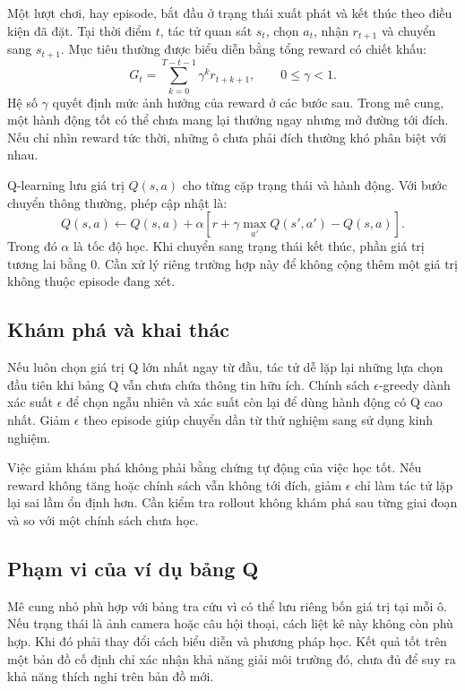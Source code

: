 Một lượt chơi, hay episode, bắt đầu ở trạng thái xuất phát và kết thúc theo điều kiện đã đặt. Tại thời điểm $t$, tác tử quan sát $s_t$, chọn $a_t$, nhận $r_{t+1}$ và chuyển sang $s_{t+1}$. Mục tiêu thường được biểu diễn bằng tổng reward có chiết khấu:
\begin{equation}
G_t=\sum_{k=0}^{T-t-1}\gamma^k r_{t+k+1},\qquad 0\leq\gamma<1.
\end{equation}
Hệ số $\gamma$ quyết định mức ảnh hưởng của reward ở các bước sau. Trong mê cung, một hành động tốt có thể chưa mang lại thưởng ngay nhưng mở đường tới đích. Nếu chỉ nhìn reward tức thời, những ô chưa phải đích thường khó phân biệt với nhau.

Q-learning lưu giá trị $Q(s,a)$ cho từng cặp trạng thái và hành động. Với bước chuyển thông thường, phép cập nhật là:
\begin{equation}
Q(s,a)\leftarrow Q(s,a)+\alpha\left[r+\gamma\max_{a'}Q(s',a')-Q(s,a)\right].
\end{equation}
Trong đó $\alpha$ là tốc độ học. Khi chuyển sang trạng thái kết thúc, phần giá trị tương lai bằng 0. Cần xử lý riêng trường hợp này để không cộng thêm một giá trị không thuộc episode đang xét.

\subsection{Khám phá và khai thác}
Nếu luôn chọn giá trị Q lớn nhất ngay từ đầu, tác tử dễ lặp lại những lựa chọn đầu tiên khi bảng Q vẫn chưa chứa thông tin hữu ích. Chính sách $\epsilon$-greedy dành xác suất $\epsilon$ để chọn ngẫu nhiên và xác suất còn lại để dùng hành động có Q cao nhất. Giảm $\epsilon$ theo episode giúp chuyển dần từ thử nghiệm sang sử dụng kinh nghiệm.

Việc giảm khám phá không phải bằng chứng tự động của việc học tốt. Nếu reward không tăng hoặc chính sách vẫn không tới đích, giảm $\epsilon$ chỉ làm tác tử lặp lại sai lầm ổn định hơn. Cần kiểm tra rollout không khám phá sau từng giai đoạn và so với một chính sách chưa học.

\subsection{Phạm vi của ví dụ bảng Q}
Mê cung nhỏ phù hợp với bảng tra cứu vì có thể lưu riêng bốn giá trị tại mỗi ô. Nếu trạng thái là ảnh camera hoặc câu hội thoại, cách liệt kê này không còn phù hợp. Khi đó phải thay đổi cách biểu diễn và phương pháp học. Kết quả tốt trên một bản đồ cố định chỉ xác nhận khả năng giải môi trường đó, chưa đủ để suy ra khả năng thích nghi trên bản đồ mới.

